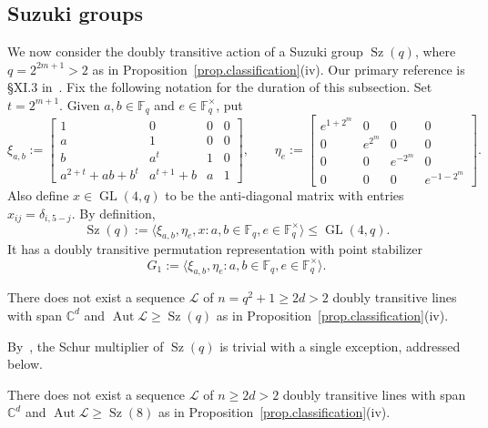 \subsection{Suzuki groups}
We now consider the doubly transitive action of a Suzuki group $\operatorname{Sz}(q)$, where $q = 2^{2m+1} > 2$ as in Proposition~\ref{prop.classification}(iv).
Our primary reference is \S XI.3 in~\cite{HuppertB:82:III}.
Fix the following notation for the duration of this subsection.
Set $t = 2^{m+1}$.
Given $a,b \in \mathbb{F}_q$ and $e \in \mathbb{F}_q^\times$, put
\[
\xi_{a,b}
:=
\begin{bmatrix}
1 & 0 & 0 & 0 \\
a & 1 & 0 & 0 \\
b & a^t & 1 & 0 \\
a^{2+t} + ab + b^t & a^{t + 1} + b & a & 1
\end{bmatrix},
\qquad
\eta_e
:=
\begin{bmatrix}
e^{1+2^m} & 0 & 0 & 0 \\
0 & e^{2^m} & 0 & 0 \\
0 & 0 & e^{-2^m} & 0 \\
0 & 0 & 0 & e^{-1-2^m}
\end{bmatrix}.
\]
Also define $x \in \operatorname{GL}(4,q)$ to be the anti-diagonal matrix with entries $x_{ij} = \delta_{i,5-j}$.
By definition,
\[ \operatorname{Sz}(q) := \langle \xi_{a,b}, \eta_e, x : a,b \in \mathbb{F}_q, e \in \mathbb{F}_q^\times \rangle \leq \operatorname{GL}(4,q). \]
It has a doubly transitive permutation representation with point stabilizer
\[ G_1 := \langle \xi_{a,b}, \eta_e : a,b \in \mathbb{F}_q, e \in \mathbb{F}_q^\times \rangle. \]


\begin{theorem}
\label{thm.Suzuki groups}
There does not exist a sequence $\mathscr{L}$ of $n = q^2+1 \geq 2d > 2$ doubly transitive lines with span $\mathbb{C}^d$ and $\operatorname{Aut} \mathscr{L} \geq \operatorname{Sz}(q)$ as in Proposition~\ref{prop.classification}(iv).
\end{theorem}

By~\cite{AlperinGorenstein:66}, the Schur multiplier of $\operatorname{Sz}(q)$ is trivial with a single exception, addressed below.

\begin{lemma}
\label{lem.Sz8}
There does not exist a sequence $\mathscr{L}$ of $n \geq 2d > 2$ doubly transitive lines with span $\mathbb{C}^d$ and $\operatorname{Aut} \mathscr{L} \geq \operatorname{Sz}(8)$ as in Proposition~\ref{prop.classification}(iv).
\end{lemma}

